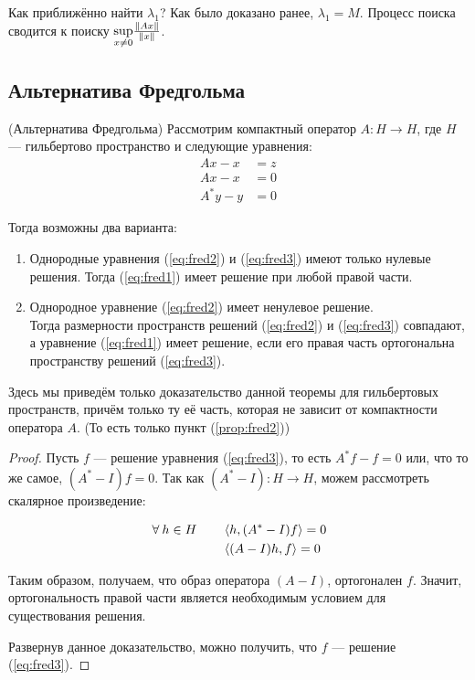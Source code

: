 \documentclass[12pt]{article}
\begin{document}
			Как приближённо найти $\lambda_1$? Как было доказано ранее, $\lambda_1 = M$. Процесс поиска сводится к поиску 
			$\underset{x\neq0}{\sup}{\frac{\left\| Ax \right\|}{\left\| x \right\|}}$.
	
	\subsection{Альтернатива Фредгольма}
	
		\begin{theorem}
			(Альтернатива Фредгольма) Рассмотрим компактный оператор $A: H\rightarrow H$, где 
			$H$ --- гильбертово пространство и следующие уравнения:
			\begin{align}
				Ax - x &= z   \tag{но} \label{eq:fred1} \\
				Ax - x &= 0   \tag{о} \label{eq:fred2} \\
				A^*y - y &= 0 \tag{со} \label{eq:fred3}
			\end{align}
		
			Тогда возможны два варианта:
			\begin{enumerate}
				\item Однородные уравнения (\ref{eq:fred2}) и (\ref{eq:fred3}) имеют только 
				нулевые решения. \label{prop:fred1}
				Тогда (\ref{eq:fred1}) имеет решение при любой правой части.
			
				\item Однородное уравнение (\ref{eq:fred2}) имеет ненулевое решение. \label{prop:fred2}\\
				Тогда размерности пространств решений (\ref{eq:fred2}) и (\ref{eq:fred3}) совпадают,
				а уравнение (\ref{eq:fred1}) имеет решение, если его правая часть ортогональна 
				пространству решений (\ref{eq:fred3}).
			\end{enumerate}
		\end{theorem}
		Здесь мы приведём только доказательство данной теоремы для гильбертовых пространств, причём только ту её 
		часть, которая не зависит от компактности оператора $A$. (То есть только пункт (\ref{prop:fred2}))
		\begin{proof}
			Пусть $f$ --- решение уравнения (\ref{eq:fred3}), то есть $A^*f - f = 0$ или, что то же самое, 
			$(A^* - I)f = 0$. Так как $(A^* - I): H \rightarrow H$, можем рассмотреть скалярное произведение:
		
			\begin{align*}
				\forall h \in H \qquad &\scal{h}{(A^*-I)f} = 0 \\
					                   &\scal{(A-I)h}{f} = 0
			\end{align*}
		
			Таким образом, получаем, что образ оператора $(A-I)$, ортогонален $f$. Значит, ортогональность 
			правой части является необходимым условием для существования решения.
		
			Развернув данное доказательство, можно получить, что $f$ --- решение (\ref{eq:fred3}).
		\end{proof}
	
\end{document}
